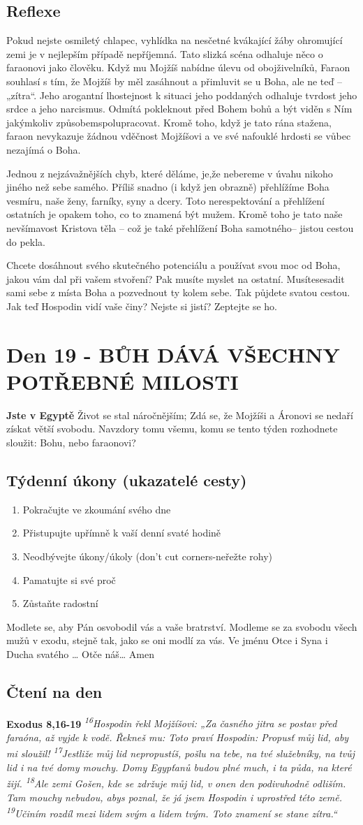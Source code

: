 \documentclass[11pt]{article}
\newcommand{\zacatekTretiTyden}{
  \textbf{Jste v Egyptě} \newline
  Život se stal náročnějším; Zdá se, že Mojžíši a Áronovi se nedaří získat větší svobodu. Navzdory tomu všemu,
komu se tento týden rozhodnete sloužit: Bohu, nebo faraonovi?

\subsection*{Týdenní úkony (ukazatelé cesty)}
\begin{enumerate}
  \item Pokračujte ve zkoumání svého dne
  \item Přistupujte upřímně k vaší denní svaté hodině
  \item Neodbývejte úkony/úkoly (don’t cut corners-neřežte rohy)
  \item Pamatujte si své proč
  \item Zůstaňte radostní
\end{enumerate}
Modlete se, aby Pán osvobodil vás a vaše bratrství. \newline
Modleme se za svobodu všech mužů v exodu, stejně tak, jako se oni modlí za vás.\newline
Ve jménu Otce i Syna i Ducha svatého …  Otče náš… Amen
}
\begin{document}
\subsection*{Reflexe}

Pokud nejste osmiletý chlapec, vyhlídka na nesčetné kvákající žáby ohromující zemi je v nejlepším případě
nepříjemná. Tato slizká scéna odhaluje něco o faraonovi jako člověku. Když mu Mojžíš nabídne úlevu od
obojživelníků, Faraon souhlasí s tím, že Mojžíš by měl zasáhnout a přimluvit se u Boha, ale ne teď – „zítra“. Jeho
arogantní lhostejnost k situaci jeho poddaných odhaluje tvrdost jeho srdce a jeho narcismus. Odmítá pokleknout
před Bohem bohů a být viděn s Ním jakýmkoliv způsobemspolupracovat. Kromě toho, když je tato rána stažena,
faraon nevykazuje žádnou vděčnost Mojžíšovi a ve své nafouklé hrdosti se vůbec nezajímá o Boha.

Jednou z nejzávažnějších chyb, které děláme, je,že nebereme v úvahu nikoho jiného než sebe samého. Příliš snadno
(i když jen obrazně) přehlížíme Boha vesmíru, naše ženy, farníky, syny a dcery. Toto nerespektování a přehlížení
ostatních je opakem toho, co to znamená být mužem. Kromě toho je tato naše nevšímavost Kristova těla – což je
také přehlížení Boha samotného– jistou cestou do pekla.

Chcete dosáhnout svého skutečného potenciálu a používat svou moc od Boha, jakou vám dal při vašem stvoření?
Pak musíte myslet na ostatní. Musítesesadit sami sebe z místa Boha a pozvednout ty kolem sebe. Tak půjdete
svatou cestou. Jak teď Hospodin vidí vaše činy? Nejste si jistí? Zeptejte se ho.

\newpage
\section{Den 19 - BŮH DÁVÁ VŠECHNY POTŘEBNÉ MILOSTI}
\zacatekTretiTyden
\subsection*{Čtení na den}
\textbf{Exodus 8,16-19}
\newline
\textit{
\textsuperscript{16}Hospodin řekl Mojžíšovi: „Za časného jitra se postav před faraóna, až vyjde k vodě. Řekneš mu: Toto praví Hospodin: Propusť můj lid, aby mi sloužil!
\textsuperscript{17}Jestliže můj lid nepropustíš, pošlu na tebe, na tvé služebníky, na tvůj lid i na tvé domy mouchy. Domy Egypťanů budou plné much, i ta půda, na které žijí. 
\textsuperscript{18}Ale zemi Gošen, kde se zdržuje můj lid, v onen den podivuhodně odliším. Tam mouchy nebudou, abys poznal, že já jsem Hospodin i uprostřed této země.
\textsuperscript{19}Učiním rozdíl mezi lidem svým a lidem tvým. Toto znamení se stane zítra.“
}
\end{document}
